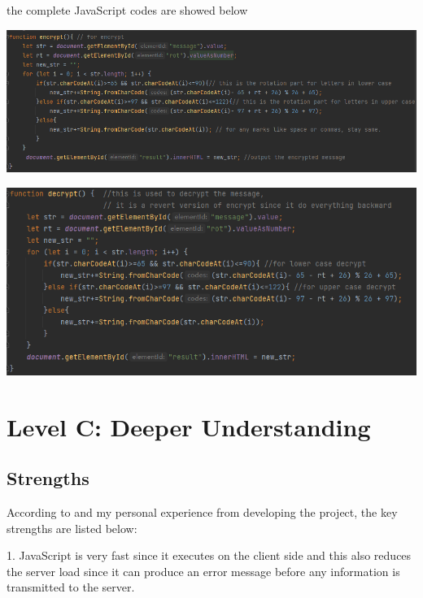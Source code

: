 \documentclass[a4paper, 11pt]{report}
\begin{document}
the complete JavaScript codes are showed below

\includegraphics[width=14cm]{screengrabs/JavaScript encrypt.png}

\includegraphics[width=14cm]{screengrabs/JavaScript decrypt.png}


\newpage
\section{Level C: Deeper Understanding}


\subsection{Strengths}
According to \cite{geeksforgeeks-2023B} and my personal experience from developing the project, the key strengths are listed below:

1. JavaScript is very fast since it executes on the client side and this also reduces the server load since it can produce an error message before any information is transmitted to the server.
\end{document}
